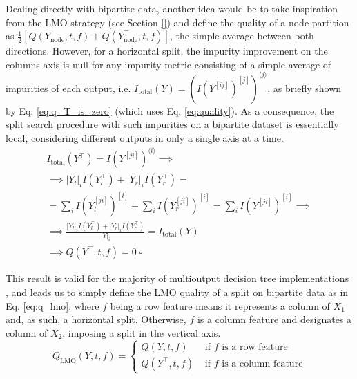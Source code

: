 \documentclass[conference]{IEEEtran}
\newcommand{\el}[1]{^{[#1]}}
\newcommand{\mel}[1]{^{\langle #1 \rangle}}
\newcommand{\T}{^\intercal}
\begin{document}
Dealing directly with bipartite data, another idea would be to take inspiration from the LMO strategy (see Section \ref{}) and define the quality of a node partition as $\frac{1}{2}[Q(Y_\text{node}, t, f)+Q(Y\T_\text{node}, t, f)]$, the simple average between both directions. However, for a horizontal split, the impurity improvement on the columns axis is null for any impurity metric consisting of a simple average of impurities of each output, i.e. $I_\text{total}(Y)=(I(Y\el{ij})\el j)\mel j$, as briefly shown by Eq. \ref{eq:q_T_is_zero} (which uses Eq. \ref{eq:quality}). As a consequence, the split search procedure with such impurities on a bipartite dataset is essentially local, considering different outputs in only a single axis at a time.
\begin{multline}
    I_\text{total}(Y\T) = I(Y\el{ji})\mel i\implies\\
    \implies |Y_l|_i I(Y_l\T) + |Y_r|_i I(Y_r\T)=\\
    = \sum_i I(Y_l\el{ji})\el i + \sum_i I(Y_r\el{ji})\el i %
    = \sum_i I(Y\el{ji})\el i\implies\\
    \implies \frac{|Y_l|_i I(Y_l\T) + |Y_r|_i I(Y_r\T)}{|Y|_i}=I_\text{total}(Y)\\
    \implies Q(Y\T, t, f) = 0 \;\square
    \label{eq:q_T_is_zero}
\end{multline}

This result is valid for the majority of multioutput decision tree implementations \cite{}, and leads us to simply define the LMO quality of a split on bipartite data as in Eq. \ref{eq:q_lmo}, where $f$ being a row feature means it represents a column of $X_1$ and, as such, a horizontal split. Otherwise, $f$ is a column feature and designates a column of $X_2$, imposing a split in the vertical axis.
\begin{equation}
    Q_\text{LMO}(Y, t, f) =
    \begin{cases}
        Q(Y, t, f)&\text{ if $f$ is a row feature}\\
        Q(Y\T, t, f)&\text{ if $f$ is a column feature}
    \end{cases}
    \label{eq:q_lmo}
\end{equation}
\end{document}
